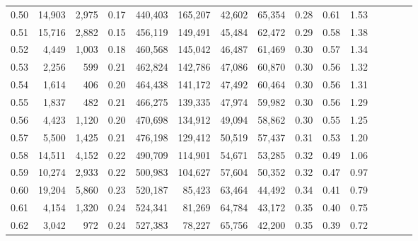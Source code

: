 \begin{tabular}{rrrcrrrrrrrrrrr}
0.50 &  14,903 &  2,975 &                                       0.17 &  440,403 &  165,207 &   42,602 &   65,354 &  0.28 &  0.61 &                         1.53 \\
0.51 &  15,716 &  2,882 &                                       0.15 &  456,119 &  149,491 &   45,484 &   62,472 &  0.29 &  0.58 &                         1.38 \\
0.52 &   4,449 &  1,003 &                                       0.18 &  460,568 &  145,042 &   46,487 &   61,469 &  0.30 &  0.57 &                         1.34 \\
0.53 &   2,256 &    599 &                                       0.21 &  462,824 &  142,786 &   47,086 &   60,870 &  0.30 &  0.56 &                         1.32 \\
0.54 &   1,614 &    406 &                                       0.20 &  464,438 &  141,172 &   47,492 &   60,464 &  0.30 &  0.56 &                         1.31 \\
0.55 &   1,837 &    482 &                                       0.21 &  466,275 &  139,335 &   47,974 &   59,982 &  0.30 &  0.56 &                         1.29 \\
0.56 &   4,423 &  1,120 &                                       0.20 &  470,698 &  134,912 &   49,094 &   58,862 &  0.30 &  0.55 &                         1.25 \\
0.57 &   5,500 &  1,425 &                                       0.21 &  476,198 &  129,412 &   50,519 &   57,437 &  0.31 &  0.53 &                         1.20 \\
0.58 &  14,511 &  4,152 &                                       0.22 &  490,709 &  114,901 &   54,671 &   53,285 &  0.32 &  0.49 &                         1.06 \\
0.59 &  10,274 &  2,933 &                                       0.22 &  500,983 &  104,627 &   57,604 &   50,352 &  0.32 &  0.47 &                         0.97 \\
0.60 &  19,204 &  5,860 &                                       0.23 &  520,187 &   85,423 &   63,464 &   44,492 &  0.34 &  0.41 &                         0.79 \\
0.61 &   4,154 &  1,320 &                                       0.24 &  524,341 &   81,269 &   64,784 &   43,172 &  0.35 &  0.40 &                         0.75 \\
0.62 &   3,042 &    972 &                                       0.24 &  527,383 &   78,227 &   65,756 &   42,200 &  0.35 &  0.39 &                         0.72 \\

\end{tabular}
